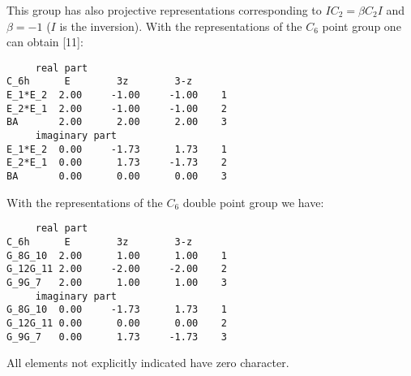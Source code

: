 \documentclass[12pt,a4paper]{article}
\begin{document}
This group has also projective representations corresponding to
$IC_2 = \beta C_2 I$ and $\beta=-1$ ($I$ is the inversion).
With the representations of the $C_6$ point group one can obtain [11]:
\begin{verbatim}
     real part
C_6h      E        3z        3-z
E_1*E_2  2.00     -1.00     -1.00    1
E_2*E_1  2.00     -1.00     -1.00    2
BA       2.00      2.00      2.00    3
     imaginary part
E_1*E_2  0.00     -1.73      1.73    1
E_2*E_1  0.00      1.73     -1.73    2
BA       0.00      0.00      0.00    3
\end{verbatim}
With the representations of the $C_6$ double point group we have:
\begin{verbatim}
     real part
C_6h      E        3z        3-z
G_8G_10  2.00      1.00      1.00    1
G_12G_11 2.00     -2.00     -2.00    2
G_9G_7   2.00      1.00      1.00    3
     imaginary part
G_8G_10  0.00     -1.73      1.73    1
G_12G_11 0.00      0.00      0.00    2
G_9G_7   0.00      1.73     -1.73    3
\end{verbatim}
All elements not explicitly indicated have zero character.

\newpage
\end{document}

